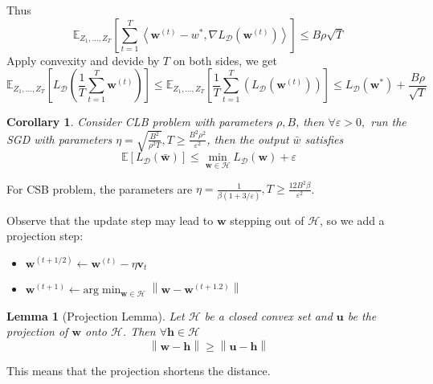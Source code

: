 \documentclass{book}
\renewcommand{\H}{\mathcal{H}}
\newcommand{\D}{\mathcal{D}}
\newtheorem{Lemma}[Thm]{Lemma}
\newtheorem{Cor}[Thm]{Corollary}
\begin{document}
Thus 
\begin{equation}
\mathbb{E}_{Z_1,\dots,Z_T}\left[ \sum_{t=1}^T \left\langle \mathbf{w}^{(t)}-w^{*},\nabla L_{\D}\left( \mathbf{w}^{(t)}\right) \right\rangle\right]\leq B\rho \sqrt{T} 
\end{equation}
Apply convexity and devide by $T$ on both sides, we get 
\begin{equation}
\mathbb{E}_{Z_{1},\dots, Z_{T}}\left[ L_{\D}\left( \frac{1}{T}\sum\limits_{t=1}^{T}\mathbf{w}^{(t)}\right)\right]\leq \mathbb{E}_{Z_1,\dots, Z_T}\left[ \frac{1}{T}\sum_{t=1}^T \left( L_{\D}\left( \mathbf{w}^{(t)}\right) \right)\right]\leq L_{\D}\left( \mathbf{w}^{*}\right)+\frac{B\rho}{\sqrt{T}}  
\end{equation}

\begin{Cor}
  Consider CLB problem with parameters $\rho, B$, then $\forall\varepsilon>0,$ run the SGD with parameters $\eta=\sqrt{\frac{B^2}{\rho^{2}T}}, T\geq \frac{B^2\rho^2}{\varepsilon^2}$, then the output $\bar{w}$ satisfies 
\begin{equation}
\mathbb{E}\left[ L_{\D}\left( \mathbf{\bar{w}}\right)\right]\leq\min_{\mathbf{w}\in\H}L_{\D}\left( \mathbf{w}\right)+\varepsilon 
\end{equation}
\end{Cor}

For CSB problem, the parameters are $\eta=\frac{1}{\beta(1+3/\varepsilon)}, T\geq \frac{12B^2\beta}{\varepsilon^2}$.

Observe that the update step may lead to $\mathbf{w}$ stepping out of $\H$, so we add a projection step: 
\begin{itemize}
\item $\mathbf{w}^{(t+1/2)}\leftarrow \mathbf{w}^{(t)}-\eta \mathbf{v}_t$
\item $\mathbf{w}^{(t+1)}\leftarrow \mathrm{arg}\min_{\mathbf{w}\in\H}\left\|  \mathbf{w}-\mathbf{w}^{(t+1.2)}\right\| $
\end{itemize}

\begin{Lemma}[Projection Lemma]
Let $\H$ be a closed convex set and $\mathbf{u}$ be the projection of $\mathbf{w}$ onto $\H$. Then $\forall \mathbf{h}\in \H$ 
\begin{equation}
\left\| \mathbf{w}-\mathbf{h} \right\|\geq \left\|  \mathbf{u}-\mathbf{h}\right\|
\end{equation}  
\end{Lemma}

This means that the projection shortens the distance.
\end{document}
